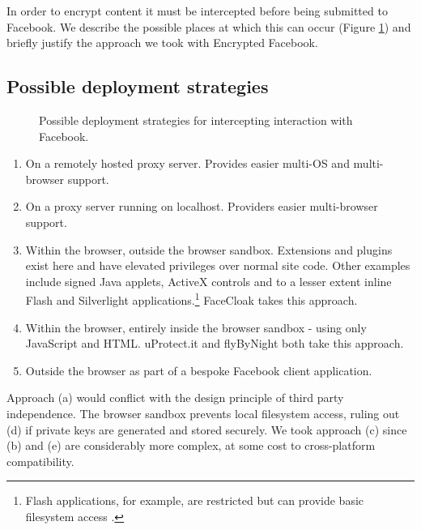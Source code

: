 In order to encrypt content it must be intercepted before being submitted to Facebook. We describe the possible places at which this can occur (Figure \ref{fig:approaches}) and briefly justify the approach we took with Encrypted Facebook.

\subsection{Possible deployment strategies}

\begin{figure}[tb]
\begin{center}
    
\caption{Possible deployment strategies for intercepting interaction with Facebook.}
\label{fig:approaches}
\end{center}
\end{figure}


\begin{enumerate}
\renewcommand{\labelenumi}{\alph{enumi})}
    
    \item On a remotely hosted proxy server. Provides easier multi-OS and multi-browser support.
    
    \item On a proxy server running on localhost. Providers easier multi-browser support.
    
    \item Within the browser, outside the browser sandbox. Extensions and plugins exist here and have elevated privileges over normal site code. Other examples include signed Java applets, ActiveX controls and to a lesser extent inline Flash and Silverlight applications.\footnote{Flash applications, for example, are restricted but can provide basic filesystem access \cite{flash-sbox}.} FaceCloak takes this approach.
    
    \item Within the browser, entirely inside the browser sandbox - using only JavaScript and HTML. uProtect.it and flyByNight both take this approach.
    
    \item Outside the browser as part of a bespoke Facebook client application.
    
\end{enumerate}
   
Approach (a) would conflict with the design principle of third party independence. The browser sandbox prevents local filesystem access, ruling out (d) if private keys are generated and stored securely. We took approach (c) since (b) and (e) are considerably more complex, at some cost to cross-platform compatibility.




